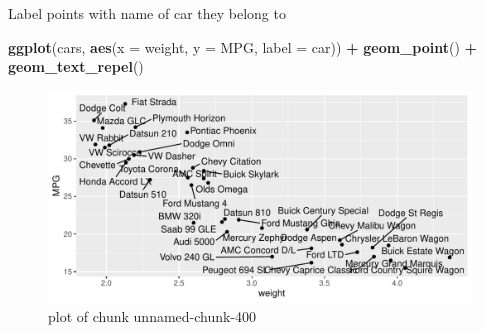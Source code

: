 \documentclass[ignorenonframetext,]{beamer}
\newenvironment{Shaded}{\begin{snugshade}}{\end{snugshade}}
\newcommand{\DataTypeTok}[1]{\textcolor[rgb]{0.13,0.29,0.53}{#1}}
\newcommand{\KeywordTok}[1]{\textcolor[rgb]{0.13,0.29,0.53}{\textbf{#1}}}
\newcommand{\NormalTok}[1]{#1}
\newcommand{\OperatorTok}[1]{\textcolor[rgb]{0.81,0.36,0.00}{\textbf{#1}}}
\newcommand{\StringTok}[1]{\textcolor[rgb]{0.31,0.60,0.02}{#1}}
\begin{document}
\begin{frame}[fragile]{Label points with name of car they belong to}
\protect\hypertarget{label-points-with-name-of-car-they-belong-to}{}

\begin{Shaded}
\begin{Highlighting}[]
\KeywordTok{ggplot}\NormalTok{(cars, }\KeywordTok{aes}\NormalTok{(}\DataTypeTok{x =}\NormalTok{ weight, }\DataTypeTok{y =}\NormalTok{ MPG, }\DataTypeTok{label =}\NormalTok{ car)) }\OperatorTok{+}
\StringTok{  }\KeywordTok{geom_point}\NormalTok{() }\OperatorTok{+}\StringTok{ }\KeywordTok{geom_text_repel}\NormalTok{()}
\end{Highlighting}
\end{Shaded}

\begin{figure}
\centering
\includegraphics{figure/unnamed-chunk-400-1.pdf}
\caption{plot of chunk unnamed-chunk-400}
\end{figure}

\end{frame}
\end{document}

